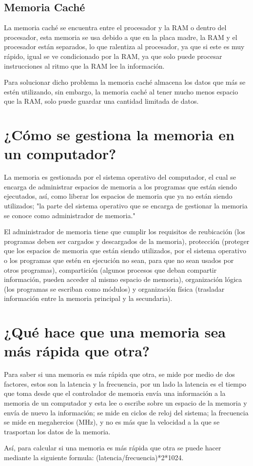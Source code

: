 \documentclass{article}
\begin{document}
\subsection{Memoria Caché}
La memoria caché se encuentra entre el procesador y la RAM o dentro del procesador, esta memoria se usa debido a que en la placa madre, la RAM y el procesador están separados, lo que ralentiza al procesador, ya que si este es muy rápido, igual se ve condicionado por la RAM, ya que solo puede procesar instrucciones al ritmo que la RAM lee la información.
\vspace{0.5cm}

Para solucionar dicho problema la memoria caché almacena los datos que más se estén utilizando, sin embargo, la memoria caché al tener mucho menos espacio que la RAM, solo puede guardar una cantidad limitada de datos.\cite{Salazar}

\section{¿Cómo se gestiona la memoria en un computador?}
La memoria es gestionada por el sistema operativo del computador, el cual se encarga de administrar espacios de memoria a los programas que están siendo ejecutados, así, como liberar los espacios de memoria que ya no están siendo utilizados; "la parte del sistema operativo que se encarga de gestionar la memoria se conoce como administrador de memoria."\cite{aguilera2015sistemas}
\vspace{0.5cm}

El administrador de memoria tiene que cumplir los requisitos de reubicación (los programas deben ser cargados y descargados de la memoria), protección (proteger que los espacios de memoria que están siendo utilizados, por el sistema operativo o los programas que estén en ejecución no sean, para que no sean usados por otros programas), compartición (algunos procesos que deban compartir información, pueden acceder al mismo espacio de memoria), organización lógica (los programas se escriban como módulos) y organización física (trasladar información entre la memoria principal y la secundaria).\cite{aguilera2015sistemas} 

\section{¿Qué hace que una memoria sea más rápida que otra?}
Para saber si una memoria es más rápida que otra, se mide por medio de dos factores, estos son la latencia y la frecuencia, por un lado la latencia es el tiempo que toma desde que el controlador de memoria envía una información  a la memoria de un computador y esta lee o escribe sobre un espacio de la memoria y envía de nuevo la información; se mide en ciclos de reloj del sistema\cite{Salazar}; la frecuencia se mide en megahercios (MHz), y no es más que la velocidad a la que se trasportan los datos de la memoria.\cite{computerhoy}
\vspace{0.5cm}

Así, para calcular si una memoria es más rápida que otra se puede hacer mediante la siguiente formula: (latencia/frecuencia)*2*1024.\cite{computerhoy}



\end{document}
